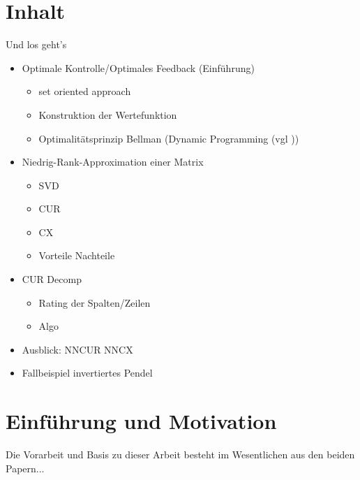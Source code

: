 \documentclass[12pt,a4paper,twoside]{article}
\begin{document}
\newpage
\tableofcontents
\newpage

\pagestyle{headings}

\section{Inhalt}
Und los geht's
\begin{itemize}
	\item Optimale Kontrolle/Optimales Feedback (Einführung)
		\begin{itemize}
			\item set oriented approach
			\item Konstruktion der Wertefunktion
			\item Optimalitätsprinzip Bellman (Dynamic Programming (vgl \cite{mahoney2008}))
		\end{itemize}
	\item Niedrig-Rank-Approximation einer Matrix
		\begin{itemize}
			\item SVD
			\item CUR
			\item CX
			\item Vorteile Nachteile
		\end{itemize}
	\item CUR Decomp
		\begin{itemize}
			\item Rating der Spalten/Zeilen
			\item Algo
		\end{itemize}
	\item Ausblick: NNCUR NNCX
	\item Fallbeispiel invertiertes Pendel
\end{itemize}
\section{Einführung und Motivation}
	Die Vorarbeit und Basis zu dieser Arbeit besteht im Wesentlichen aus den beiden Papern...
\end{document}

